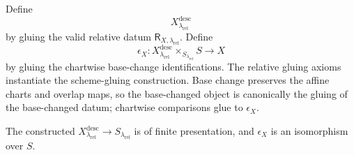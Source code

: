 \begin{definition}
  \label{def:nagata-finite-presentation-descent}

  Define
  \[
    X^{\mathrm{desc}}_{\lambda_{\mathrm{rel}}}
  \]
  by gluing the valid relative datum
  $\mathsf R_{X,\lambda_{\mathrm{rel}}}$.  Define
  \[
    \epsilon_X\colon
      X^{\mathrm{desc}}_{\lambda_{\mathrm{rel}}}
        \times_{S_{\lambda_{\mathrm{rel}}}}S
      \longrightarrow X
  \]
  by gluing the chartwise base-change identifications.
  The relative gluing axioms instantiate the scheme-gluing construction. Base
  change preserves the affine charts and overlap maps, so the base-changed
  object is canonically the gluing of the base-changed datum; chartwise
  comparisons glue to $\epsilon_X$.
\end{definition}

\begin{lemma}
  \label{lemma:nagata-finite-presentation-descends}

  The constructed
  $X^{\mathrm{desc}}_{\lambda_{\mathrm{rel}}}\to
  S_{\lambda_{\mathrm{rel}}}$ is of finite presentation, and
  $\epsilon_X$ is an isomorphism over $S$.
\end{lemma}

